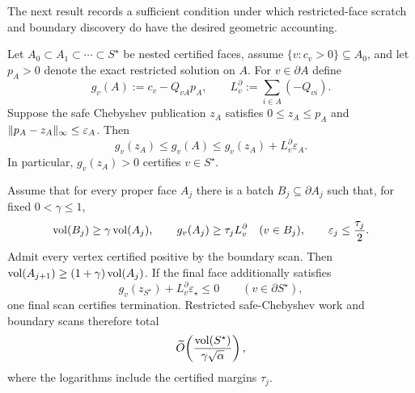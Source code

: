 The next result records a sufficient condition under which restricted-face
scratch and boundary discovery do have the desired geometric accounting.

\begin{proposition}
\label{prop:aesp-cd-geometric-face-batches}
Let $A_0\subset A_1\subset\cdots\subset S^\star$ be nested certified faces,
assume $\{v:c_v>0\}\subseteq A_0$, and let $p_A>0$ denote the exact
restricted solution on $A$.  For
$v\in\partial A$ define
\begin{equation*}
 g_v(A):=c_v-Q_{vA}p_A,
 \qquad
 L_v^\partial:=\sum_{i\in A}(-Q_{vi}).
\end{equation*}
Suppose the safe Chebyshev publication $z_A$ satisfies
$0\leq z_A\leq p_A$ and
$\lVert p_A-z_A\rVert_\infty\leq\varepsilon_A$.  Then
\begin{equation}
 g_v(z_A)\leq g_v(A)
 \leq g_v(z_A)+L_v^\partial\varepsilon_A.
 \label{eq:aesp-cd-boundary-key-interval}
\end{equation}
In particular, $g_v(z_A)>0$ certifies $v\in S^\star$.

Assume that for every proper face $A_j$ there is a batch
$B_j\subseteq\partial A_j$ such that, for fixed $0<\gamma\leq1$,
\begin{equation}
 \operatorname{vol}(B_j)\geq\gamma\operatorname{vol}(A_j),
 \qquad
 g_v(A_j)\geq\tau_jL_v^\partial\quad(v\in B_j),
 \qquad
 \varepsilon_j\leq\frac{\tau_j}{2}.
 \label{eq:aesp-cd-geometric-face-batch-hypothesis}
\end{equation}
Admit every vertex certified positive by the boundary scan.  Then
$\operatorname{vol}(A_{j+1})\geq(1+\gamma)\operatorname{vol}(A_j)$.  If the final face additionally
satisfies
\begin{equation*}
 g_v(z_{S^\star})+L_v^\partial\varepsilon_\star\leq0
 \qquad(v\in\partial S^\star),
\end{equation*}
one final scan certifies termination.  Restricted safe-Chebyshev work and
boundary scans therefore total
\begin{equation}
 \widetilde O\!\left(
   \frac{\operatorname{vol}(S^\star)}{\gamma\sqrt\alpha}\right),
 \label{eq:aesp-cd-geometric-face-batch-work}
\end{equation}
where the logarithms include the certified margins $\tau_j$.
\end{proposition}

